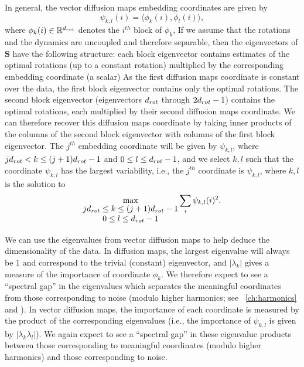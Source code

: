 In general, the vector diffusion maps embedding coordinates are given by
\begin{equation} \label{eq:vdm_coord}
\psi_{k,l} (i) = \langle \phi_k(i), \phi_l(i) \rangle,
\end{equation}
where $\phi_k(i) \in \mathbb{R}^{d_{rot}}$ denotes the $i^{th}$ block of $\phi_k$,
%
If we assume that the rotations and the dynamics are uncoupled and therefore separable, then the eigenvectors of $\mathbf{S}$ have the following structure: each block eigenvector contains estimates of the optimal rotations (up to a constant rotation) multiplied by the corresponding embedding coordinate (a scalar)
%
As the first diffusion maps coordinate is constant over the data, the first block eigenvector contains only the optimal rotations.
%
The second block eigenvector (eigenvectors $d_{rot}$ through $2d_{rot}-1$) contains the optimal rotations, each multiplied by their second diffusion maps coordinate.
%
We can therefore recover this diffusion maps coordinate by taking inner products of the columns of the second block eigenvector with columns of the first block eigenvector.
%
The $j^{th}$ embedding coordinate will be given by $\psi_{k,l}$, where $jd_{rot}  < k \le (j+1)d_{rot}-1$ and $0 \le l \le d_{rot}-1$,
and we select $k, l$ such that the coordinate $\psi_{k, l}$ has the largest variability, i.e., the $j^{th}$ coordinate is $\psi_{k,l}$, where $k, l$ is the solution to
\begin{equation} \label{eq:first_embed_vdm}
\max_{
\begin{matrix}
jd_{rot} \le k \le (j+1)d_{rot}-1 \\
0 \le l \le d_{rot}-1
\end{matrix}}
 \sum_i \psi_{k,l} (i)^2.
\end{equation}


We can use the eigenvalues from vector diffusion maps to help deduce the dimensionality of the data.
%
In diffusion maps, the largest eigenvalue will always be 1 and correspond to the trivial (constant) eigenvector, and $|\lambda_k|$ gives a measure of the importance of coordinate $\phi_k$.
%
We therefore expect to see a ``spectral gap'' in the eigenvalues which separates the meaningful coordinates from those corresponding to noise (modulo higher harmonics; see \chap~\ref{ch:harmonics} and \citep{ferguson2010systematic}).
%
In vector diffusion maps, the importance of each coordinate is measured by the product of the corresponding eigenvalues (i.e., the importance of $\psi_{k,l}$ is given by $| \lambda_k \lambda_l |$).
%
We again expect to see a ``spectral gap'' in these eigenvalue products between those corresponding to meaningful coordinates (modulo higher harmonics) and those corresponding to noise. 